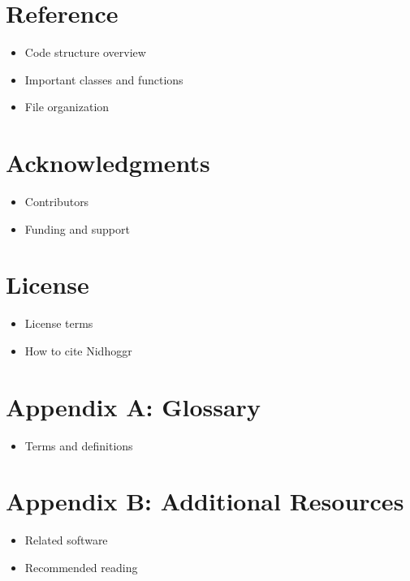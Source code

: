 \documentclass[12pt]{article}
\begin{document}
	\section{Reference}
	\begin{itemize}
		\item Code structure overview
		\item Important classes and functions
		\item File organization
	\end{itemize}
	
	\section{Acknowledgments}
	\begin{itemize}
		\item Contributors
		\item Funding and support
	\end{itemize}
	
	\section{License}
	\begin{itemize}
		\item License terms
		\item How to cite Nidhoggr
	\end{itemize}
	
	\appendix
	
	\section{Appendix A: Glossary}
	\begin{itemize}
		\item Terms and definitions
	\end{itemize}
	
	\section{Appendix B: Additional Resources}
	\begin{itemize}
		\item Related software
		\item Recommended reading
	\end{itemize}
	
\end{document}
